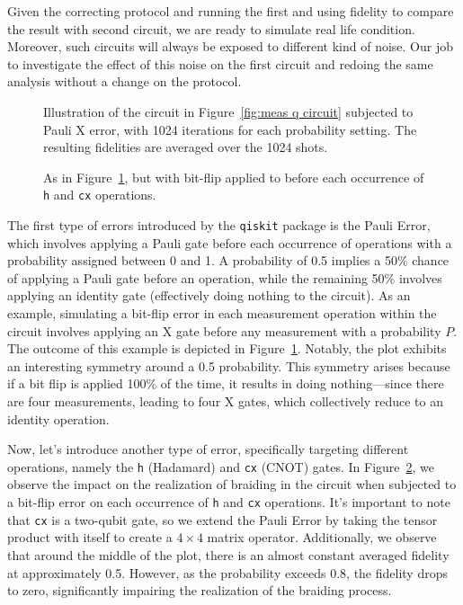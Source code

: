 \documentclass{article}
\def\c#1{\texttt{#1}}
\begin{document}
\vspace{12pt}
Given the correcting protocol and running the first and using fidelity to compare the result with second circuit, we are ready to simulate real life condition. Moreover, such circuits will always be exposed to different kind of noise. Our job to investigate the effect of this noise on the first circuit and redoing the same analysis without a change on the protocol.
\begin{figure}
  \begin{center}
    
  \end{center}
  \caption{Illustration of the circuit in Figure~\ref{fig:meas q circuit} subjected to Pauli X error, with 1024 iterations for each probability setting. The resulting fidelities are averaged over the 1024 shots.}\label{fig:with bit flip error}
\end{figure}
\begin{figure}
  \begin{center}
    
  \end{center}
  \caption{As in Figure~\ref{fig:with bit flip error}, but with bit-flip applied to before each occurrence of \c{h} and \c{cx} operations.}\label{fig:bit flip error on cx}
\end{figure}
The first type of errors introduced by the \c{qiskit} package is the Pauli Error, which involves applying a Pauli gate before each occurrence of operations with a probability assigned between 0 and 1. A probability of 0.5 implies a 50\% chance of applying a Pauli gate before an operation, while the remaining 50\% involves applying an identity gate (effectively doing nothing to the circuit). As an example, simulating a bit-flip error in each measurement operation within the circuit involves applying an X gate before any measurement with a probability \( P \). The outcome of this example is depicted in Figure~\ref{fig:with bit flip error}. Notably, the plot exhibits an interesting symmetry around a 0.5 probability. This symmetry arises because if a bit flip is applied 100\% of the time, it results in doing nothing—since there are four measurements, leading to four X gates, which collectively reduce to an identity operation.

Now, let's introduce another type of error, specifically targeting different operations, namely the \c{h} (Hadamard) and \c{cx} (CNOT) gates. In Figure~\ref{fig:bit flip error on cx}, we observe the impact on the realization of braiding in the circuit when subjected to a bit-flip error on each occurrence of \c{h} and \c{cx} operations. It's important to note that \c{cx} is a two-qubit gate, so we extend the Pauli Error by taking the tensor product with itself to create a \(4 \times 4\) matrix operator. Additionally, we observe that around the middle of the plot, there is an almost constant averaged fidelity at approximately 0.5. However, as the probability exceeds 0.8, the fidelity drops to zero, significantly impairing the realization of the braiding process.
\end{document}
